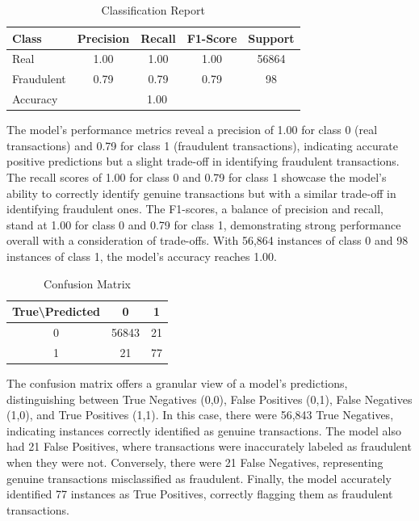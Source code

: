 \documentclass[11pt,article,oneside]{article}
\begin{document}
    
    \begin{table}[H]
        \centering
        \caption{Classification Report}
        \label{tab:best_model_classification_report}
        \begin{tabular}{@{}lcccc@{}}
        \toprule
        Class & Precision & Recall & F1-Score & Support \\ \midrule
        Real     & 1.00      & 1.00   & 1.00     & 56864   \\
        Fraudulent     & 0.79      & 0.79   & 0.79     & 98      \\ \midrule
        Accuracy & \multicolumn{3}{c}{\hspace{3cm} 1.00} & \\ \midrule
        \end{tabular}
    \end{table}
    
    
    The model's performance metrics reveal a precision of 1.00 for class 0 (real transactions) and 0.79 for class 1 
    (fraudulent transactions), indicating accurate positive predictions but a slight trade-off in identifying fraudulent transactions.
    The recall scores of 1.00 for class 0 and 0.79 for class 1 showcase the model's ability to correctly identify genuine transactions
    but with a similar trade-off in identifying fraudulent ones. The F1-scores, a balance of precision and recall, stand at 1.00 for 
    class 0 and 0.79 for class 1, demonstrating strong performance overall with a consideration of trade-offs. With 56,864 
    instances of class 0 and 98 instances of class 1, the model's accuracy reaches 1.00.
    
    \begin{table}[H]
    \centering
    \caption{Confusion Matrix}
    \begin{tabular}{|c|c|c|}
    \hline
    True\textbackslash Predicted & 0 & 1 \\
    \hline
    0 & 56843 & 21 \\
    1 & 21 & 77 \\
    \hline
    \end{tabular}
    \end{table}
    
    The confusion matrix offers a granular view of a model's predictions, distinguishing between True Negatives (0,0), 
    False Positives (0,1), False Negatives (1,0), and True Positives (1,1). In this case, there were 56,843 True Negatives, 
    indicating instances correctly identified as genuine transactions. The model also had 21 False Positives, where transactions 
    were inaccurately labeled as fraudulent when they were not. Conversely, there were 21 False Negatives, representing genuine 
    transactions misclassified as fraudulent. Finally, the model accurately identified 77 instances as True Positives, correctly 
    flagging them as fraudulent transactions. 
    
\end{document}
